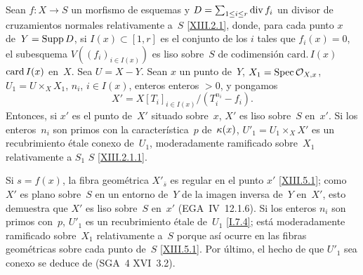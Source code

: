 
\begin{proposition}
\label{XIII.5.4} Sean $f\colon X\to S$ un morfismo de esquemas y
$D=\sum_{1\leq i\leq r} \operatorname{div} f_i$ un divisor de cruzamientos
normales relativamente a~$S$ \eqref{XIII.2.1}, donde,
para cada punto $x$ de~$Y=\operatorname{Supp} D$, si $I(x)\subset[1,r]$ es el conjunto de los $i$
tales que $f_i(x)=0$, el subesquema $V((f_i)_{i\in I(x)})$ es liso
sobre~$S$ de codimensión
{$\mathrm{card}.\,I(x)$}
{$\operatorname{card} I(x)$}
en~$X$. Sea $U=X-Y$. Sean $x$ un punto de~$Y$,
$X_1=\operatorname{Spec}\mathcal{O}_{X,x}$, $U_1=U\times_X X_1$, $n_i$, $i\in I(x)$,
{enteros}
{enteros $>0$}, y pongamos
$$
X'=X[T_i]_{i\in I(x)}/(T_i^{n_i}-f_i).
$$
Entonces, si $x'$ es el punto de~$X'$ situado sobre~$x$, $X'$ es liso
sobre~$S$ en~$x'$. Si los enteros~$n_i$ son primos con la
característica~$p$ de~$\kappa(x)$, $U'_1=U_1\times_X X'$ es un
recubrimiento étale conexo de~$U_1$, moderadamente ramificado sobre~$X_1$
relativamente a
{$S_1$}
{$S$}
\eqref{XIII.2.1.1}.
\end{proposition}

Si $s=f(x)$, la fibra geométrica $X'_{\bar{s}}$ es regular en el punto
$x'$ \eqref{XIII.5.1}; como $X'$ es plano sobre~$S$ en un entorno
{de~$Y$}
{de la imagen inversa de~$Y$ en~$X'$},
esto demuestra que $X'$ es liso sobre~$S$ en~$x'$
(EGA~IV~12.1.6). Si los enteros $n_i$ son primos con~$p$, $U'_1$ es un
recubrimiento étale de~$U_1$ \eqref{I.7.4}; está moderadamente
ramificado sobre~$X_1$ relativamente a~$S$ porque así ocurre en las
fibras geométricas sobre cada punto de~$S$ \eqref{XIII.5.1}. Por último,
el hecho de que $U'_1$ sea conexo se deduce de (SGA~4 XVI~3.2).
